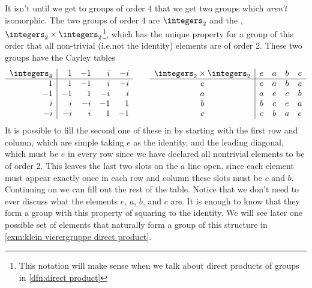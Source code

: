 It isn't until we get to groups of order 4 that we get two groups which \emph{aren't} isomorphic.
The two groups of order 4 are \(\integers_2\) and the , \(\integers_2 \times \integers_2\)\footnote{This notation will make sense when we talk about direct products of groups in \cref{dfn:direct product}}, which has the unique property for a group of this order that all non-trivial (i.e.\@ not the identity) elements are of order 2.
These two groups have the Cayley tables
\begin{equation}\label{eqn:cayley tables groups of order 4}
    \begin{array}{r|rrrr}
        \integers_4 & 1  & -1 & i  & -i \\ \hline
        1           & 1  & -1 & i  & -i \\
        -1          & -1 & 1  & -i & i  \\
        i           & i  & -i & -1 & 1  \\
        -i          & -i & i  & 1  & -1 
    \end{array}
    \qquad
    \begin{array}{c|cccc}
        \integers_2 \times \integers_2 & e & a & b & c \\ \hline
        e                              & e & a & b & c \\
        a                              & a & e & c & b \\
        b                              & b & c & e & a \\
        c                              & c & b & a & e
    \end{array}
\end{equation}
It is possible to fill the second one of these in by starting with the first row and column, which are simple taking \(e\) as the identity, and the leading diagonal, which must be \(e\) in every row since we have declared all nontrivial elements to be of order 2.
This leaves the last two slots on the \(a\) line open, since each element must appear exactly once in each row and column these slots must be \(c\) and \(b\).
Continuing on we can fill out the rest of the table.
Notice that we don't need to ever discuss what the elements \(e\), \(a\), \(b\), and \(c\) are.
It is enough to know that they form a group with this property of squaring to the identity.
We will see later one possible set of elements that naturally form a group of this structure in \cref{exm:klein vierergruppe direct product}.

